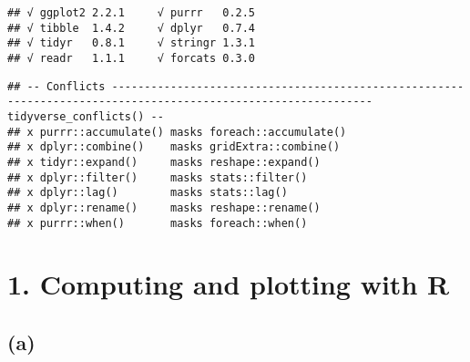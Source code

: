 \documentclass[]{article}
\begin{document}
\begin{verbatim}
## √ ggplot2 2.2.1     √ purrr   0.2.5
## √ tibble  1.4.2     √ dplyr   0.7.4
## √ tidyr   0.8.1     √ stringr 1.3.1
## √ readr   1.1.1     √ forcats 0.3.0
\end{verbatim}

\begin{verbatim}
## -- Conflicts -------------------------------------------------------------------------------------------------------------- tidyverse_conflicts() --
## x purrr::accumulate() masks foreach::accumulate()
## x dplyr::combine()    masks gridExtra::combine()
## x tidyr::expand()     masks reshape::expand()
## x dplyr::filter()     masks stats::filter()
## x dplyr::lag()        masks stats::lag()
## x dplyr::rename()     masks reshape::rename()
## x purrr::when()       masks foreach::when()
\end{verbatim}

\section{1. Computing and plotting with
R}\label{computing-and-plotting-with-r}

\subsection{(a)}\label{a}
\end{document}
